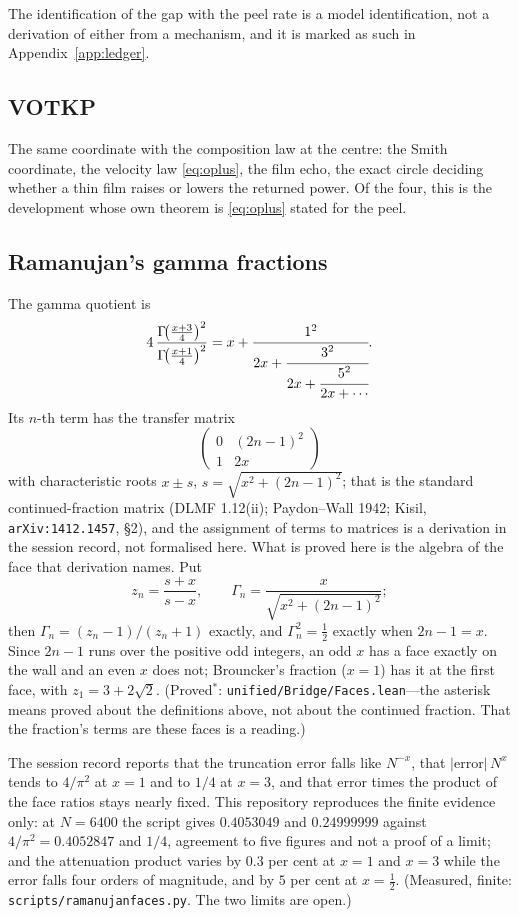 \documentclass[11pt]{article}
\newcommand{\G}{\Gamma}
\renewcommand{\_}{\origunderscore\allowbreak}
\newcommand{\W}{3+2\sqrt{2}}
\begin{document}
The identification of the gap with the peel rate is a model identification, not a derivation of
either from a mechanism, and it is marked as such in Appendix~\ref{app:ledger}.

\subsection{VOTKP}

The same coordinate with the composition law at the centre: the Smith coordinate, the velocity law
\eqref{eq:oplus}, the film echo, the exact circle deciding whether a thin film raises or lowers
the returned power. Of the four, this is the development whose own theorem is \eqref{eq:oplus}
stated for the peel.

\subsection{Ramanujan's gamma fractions}

The gamma quotient is
\begin{equation}
4\,\frac{\Gamma\!\big(\tfrac{x+3}{4}\big)^2}{\Gamma\!\big(\tfrac{x+1}{4}\big)^2}
= x+\cfrac{1^2}{2x+\cfrac{3^2}{2x+\cfrac{5^2}{2x+\cdots}}}.
\end{equation}
Its $n$-th term has the transfer matrix
\[
\begin{pmatrix}0&(2n-1)^2\\ 1&2x\end{pmatrix}
\]
with characteristic roots $x\pm s$, $s=\sqrt{x^2+(2n-1)^2}$; that is the standard
continued-fraction matrix (DLMF 1.12(ii); Paydon--Wall 1942; Kisil, \texttt{arXiv:1412.1457},
\S2), and the assignment of terms to matrices is a derivation in the session record, not formalised
here. What is proved here is the algebra of the face that derivation names. Put
\begin{equation}
z_n=\frac{s+x}{s-x},\qquad \G_n=\frac{x}{\sqrt{x^2+(2n-1)^2}};
\end{equation}
then $\G_n=(z_n-1)/(z_n+1)$ exactly, and $\G_n^2=\tfrac12$ exactly when $2n-1=x$. Since $2n-1$
runs over the positive odd integers, an odd $x$ has a face exactly on the wall and an even $x$
does not; Brouncker's fraction ($x=1$) has it at the first face, with $z_1=\W$.
(Proved${}^*$: \texttt{unified/Bridge/Faces.lean}---the asterisk means proved about the
definitions above, not about the continued fraction. That the fraction's terms are these faces is
a reading.)

The session record reports that the truncation error falls like $N^{-x}$, that
$|\text{error}|\,N^x$ tends to $4/\pi^2$ at $x=1$ and to $1/4$ at $x=3$, and that error times the
product of the face ratios stays nearly fixed. This repository reproduces the finite evidence
only: at $N=6400$ the script gives $0.4053049$ and $0.24999999$ against $4/\pi^2=0.4052847$ and
$1/4$, agreement to five figures and not a proof of a limit; and the attenuation product varies by
$0.3$ per cent at $x=1$ and $x=3$ while the error falls four orders of magnitude, and by $5$ per
cent at $x=\tfrac12$. (Measured, finite: \texttt{scripts/ramanujan\_faces.py}. The two limits are
open.)
\end{document}
